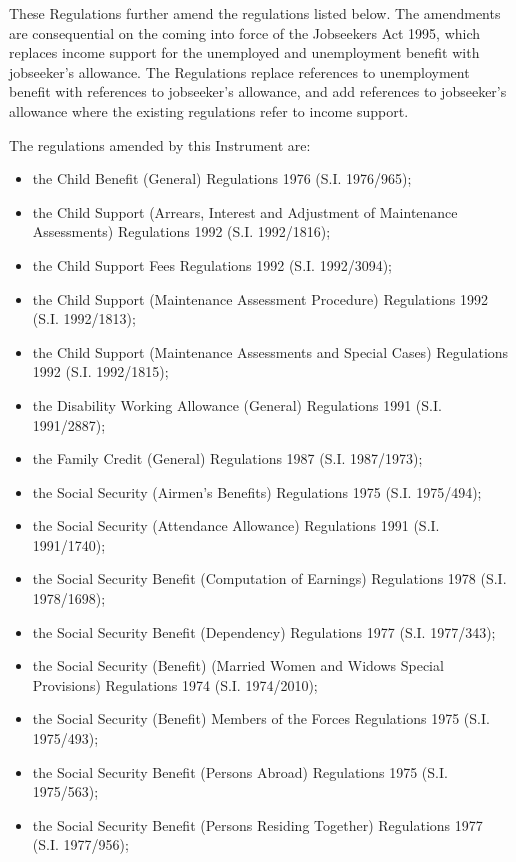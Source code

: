 \documentclass[a4paper]{article}
\begin{document}
These Regulations further amend the regulations listed below. The amendments are consequential on the coming into force of the Jobseekers Act 1995, which replaces income support for the unemployed and unemployment benefit with jobseeker’s allowance. The Regulations replace references to unemployment benefit with references to jobseeker’s allowance, and add references to jobseeker’s allowance where the existing regulations refer to income support.

  The regulations amended by this Instrument are:
\begin{itemize}
\item the Child Benefit (General) Regulations 1976 (S.I. 1976/965);
\item the Child Support (Arrears, Interest and Adjustment of Maintenance Assessments) Regulations 1992 (S.I. 1992/1816);
\item the Child Support Fees Regulations 1992 (S.I. 1992/3094);
\item the Child Support (Maintenance Assessment Procedure) Regulations 1992 (S.I. 1992/1813);
\item the Child Support (Maintenance Assessments and Special Cases) Regulations 1992 (S.I. 1992/1815);
\item the Disability Working Allowance (General) Regulations 1991 (S.I. 1991/\hspace{0pt}2887);
\item the Family Credit (General) Regulations 1987 (S.I. 1987/1973);
\item the Social Security (Airmen’s Benefits) Regulations 1975 (S.I. 1975/494);
\item the Social Security (Attendance Allowance) Regulations 1991 (S.I. 1991/\hspace{0pt}1740);
\item the Social Security Benefit (Computation of Earnings) Regulations 1978 (S.I. 1978/1698);
\item the Social Security Benefit (Dependency) Regulations 1977 (S.I. 1977/343);
\item the Social Security (Benefit) (Married Women and Widows Special Provisions) Regulations 1974 (S.I. 1974/2010);
\item the Social Security (Benefit) Members of the Forces Regulations 1975 (S.I. 1975/493);
\item the Social Security Benefit (Persons Abroad) Regulations 1975 (S.I. 1975/\hspace{0pt}563);
\item the Social Security Benefit (Persons Residing Together) Regulations 1977 (S.I. 1977/956);

\end{itemize}
\end{document}
